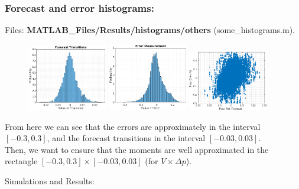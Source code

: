 \documentclass[aspectratio=169]{beamer}\usepackage[utf8]{inputenc}
\begin{document}
\begin{frame}\frametitle{Forecast and error histograms:}
Files: \textbf{MATLAB\_Files/Results/histograms/others} (some\_histograms.m).\\

\begin{figure}[ht!]
\centering
\includegraphics[width=0.31\textwidth]{../../MATLAB_Files/Results/histograms/others/forecast_transitions.eps}\quad
\includegraphics[width=0.31\textwidth]{../../MATLAB_Files/Results/histograms/others/error_measurement.eps}\quad
\includegraphics[width=0.31\textwidth]{../../MATLAB_Files/Results/histograms/others/error_and_forecast.eps}
\end{figure}
From here we can see that the errors are approximately in the interval $[-0.3,0.3]$, and the forecast transitions in the interval $[-0.03,0.03]$.\\
Then, we want to ensure that the moments are well approximated in the rectangle $[-0.3,0.3]\times[-0.03,0.03]$ (for $V\times\Delta p$).

\end{frame}


\begin{frame}

{\Huge Simulations and Results:}

\end{frame}
\end{document}
